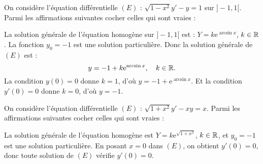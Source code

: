 \begin{question}
On considère l'équation différentielle $(E)$ : $\displaystyle \sqrt{1-x^2}y'-y=1$ sur $]-1,1[$. Parmi les affirmations suivantes cocher celles qui sont vraies :
\begin{answers}  
\end{answers}
\begin{explanations}
La solution générale de l'équation homogène sur $]-1,1[$ est : $Y=k\mathrm{e}^{\arcsin x}$, $k\in \mathbb{R}$. La fonction $y_0=-1$ est une solution particulière. Donc la solution générale de $(E)$ est :
$$y=-1+k\mathrm{e}^{\arcsin x},\quad k\in \mathbb{R}.$$
La condition $y(0)=0$ donne $k=1$, d'où $y=-1+\mathrm{e}^{\arcsin x}$. Et la condition $y'(0)=0$ donne $k=0$, d'où $y=-1$.
\end{explanations}
\end{question}

\begin{question}
On considère l'équation différentielle $(E)$ : $\displaystyle \sqrt{1+x^2}y'-xy=x$. Parmi les affirmations suivantes cocher celles qui sont vraies :
\begin{answers}  
\end{answers}
\begin{explanations}
La solution générale de l'équation homogène est $\displaystyle Y=k\mathrm{e}^{\sqrt{1+x^2}}$, $k\in \mathbb{R}$, et $y_0=-1$ est une solution particulière. En posant $x=0$ dans $(E)$, on obtient $y'(0)=0$, donc toute solution de $(E)$ vérifie $y'(0)=0$.
\end{explanations}
\end{question}


